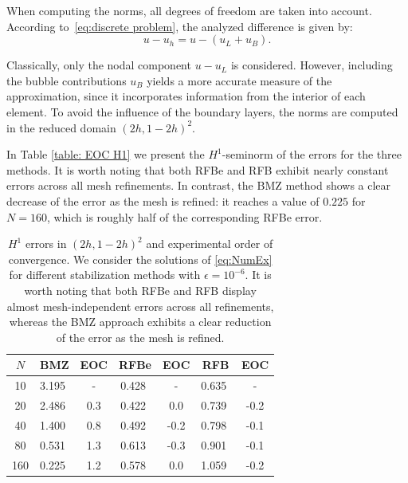 \documentclass{article}
\begin{document}
When computing the norms, all degrees of freedom are taken into account.
According to~\eqref{eq:discrete problem}, the analyzed difference is given by:  
\begin{equation*}
    u - u_h = u - (u_L + u_B).
\end{equation*}    

Classically, only the nodal component $u - u_L$ is considered.
However, including the bubble contributions $u_B$ yields a more accurate measure of the approximation, since it incorporates information from the interior of each element.
To avoid the influence of the boundary layers, the norms are computed in the reduced domain $(2h,1-2h)^2$.



In Table \ref{table: EOC H1} we present the $H^1$-seminorm of the errors for the three methods.
It is worth noting that both RFBe and RFB exhibit nearly constant errors across all mesh refinements. In contrast, the BMZ method shows a clear decrease of the error as the mesh is refined: it reaches a value of $0.225$ for $N=160$, which is roughly half of the corresponding RFBe error. 

\begin{table}[ht]
\centering
\begin{tabular}{|c|c|c|c|c|c|c|}
\hline
$N$ & BMZ & EOC & RFBe & EOC & RFB & EOC \\
\hline
10  &  3.195\,\, &   -    & 0.428\,\,&   -   & 0.635\,\, &   -  \\
20  &  2.486\,\, &  0.3   & 0.422\,\,&  0.0  & 0.739\,\, & -0.2 \\
40  &  1.400\,\, &  0.8   & 0.492\,\,& -0.2  & 0.798\,\, & -0.1 \\
80  &  0.531\,\, &  1.3   & 0.613\,\,& -0.3  & 0.901\,\, & -0.1 \\
160 &  0.225\,\, &  1.2   & 0.578\,\,&  0.0  & 1.059\,\, & -0.2 \\
\hline
\end{tabular}
\caption{\small \label{table: EOC  H1} $H^1$ errors in $(2h,1-2h)^2$ and experimental order of convergence. We consider the solutions of \eqref{eq:NumEx} for different stabilization methods with ${\epsilon=10^{-6}}$. It is worth noting that both RFBe and RFB display almost mesh-independent errors across all refinements, whereas the BMZ approach exhibits a clear reduction of the error as the mesh is refined.}
\end{table}
\end{document}
